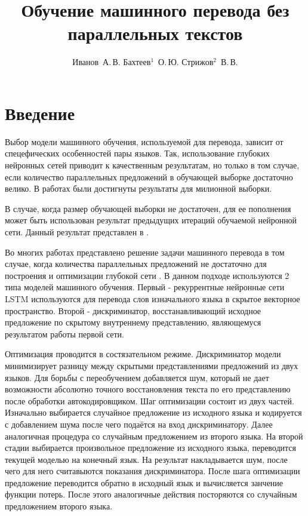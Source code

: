 \documentclass[12pt,twoside]{article}
\title
    [Обучение машинного перевода без параллельных текстов] %
    {Обучение машинного перевода без параллельных текстов}
\author
    [Иванов~А.\,В. Бахтеев$^1$~О.\,Ю.  Стрижов$^2$~В.\,В.] %
{Иванов~А.\,В. Бахтеев$^1$~О.\,Ю.  Стрижов$^2$~В.\,В.} %
[Иванов~А.\,В. Бахтеев$^1$~О.\,Ю.  Стрижов$^2$~В.\,В.] %
\begin{document}
\maketitle

\section{Введение}

Выбор модели машинного обучения, используемой для перевода, зависит от спецефических особенностей пары языков. Так, использование глубоких нейронных сетей приводит к качественным результатам, но только в том случае, если количество параллельных предложений в обучающей выборке достаточно велико. В работах  \cite{zou2013bilingual, cho2014properties} были достигнуты результаты для милионной выборки. 

В случае, когда размер обучающей выборки не достаточен, для ее пополнения может быть использован результат предыдущих итераций обучаемой нейронной сети. Данный результат представлен в \cite{bertoldi2009domain}.

Во многих работах представлено решение задачи машинного перевода в том случае, когда количества параллельных предложений не достаточно для построения и оптимизации  глубокой сети \cite{wu2016google, sutskever2014sequence, bahdanau2014neural}. В данном подходе используются 2 типа моделей машинного обучения. Первый - рекуррентные нейронные сети LSTM \cite{graves2005framewise} используются для перевода слов изначального языка в скрытое векторное пространство. Второй - дискриминатор, восстанавливающий исходное предложение по скрытому внутреннему представлению, являющемуся результатом работы первой сети.

Оптимизация проводится в состязательном режиме. Дискриминатор модели минимизирует разницу между скрытыми представлениями предложений из двух языков. Для борьбы с переобучением добавляется шум, который не дает возможности абсолютно точного восстановления текста по его представлению после обработки автокодировщиком. Шаг оптимизации состоит из двух частей. Изначально выбирается случайное предложение из исходного языка и кодируется с добавлением шума \cite{kimimproving} после чего подаётся на вход дискриминатору. Далее аналогичная процедура со случайным предложением из второго языка. На второй стадии выбирается произвольное предложение из исходного языка, переводится текущей моделью на конечный язык. На результат накладывается шум, после чего для него считавыются показания дискриминатора. После шага оптимизации предложение переводится обратно в исходный язык и вычисляется занчение функции потерь. После этого аналогичные действия посторяются со случайным предложением второго языка.
\end{document}
